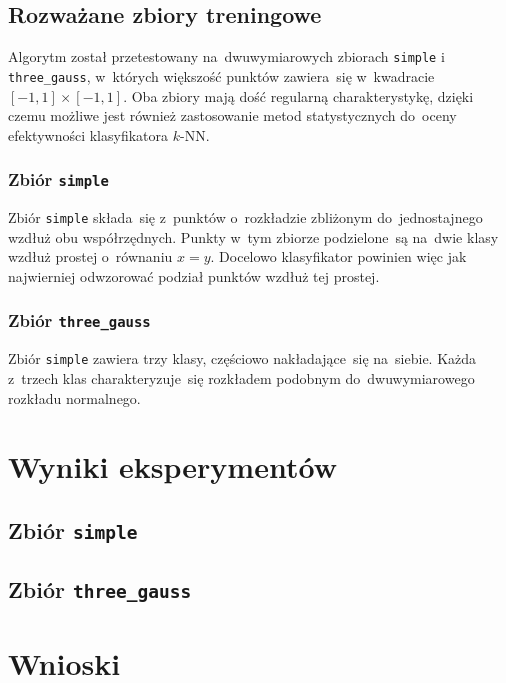 \documentclass[11pt,a4paper]{article}
\begin{document}
\subsection{Rozważane zbiory treningowe}

Algorytm został przetestowany na~dwuwymiarowych zbiorach {\tt simple} i {\tt three\_gauss}, w~których większość punktów zawiera~się w~kwadracie $[-1,1] \times [-1,1]$.
Oba zbiory mają dość regularną charakterystykę, dzięki czemu możliwe jest również zastosowanie metod statystycznych do~oceny efektywności klasyfikatora $k$-NN.

\subsubsection{Zbiór {\tt simple}}

Zbiór {\tt simple} składa~się z~punktów o~rozkładzie zbliżonym do~jednostajnego wzdłuż obu współrzędnych. %
Punkty w~tym zbiorze podzielone~są na~dwie klasy wzdłuż prostej o~równaniu $x=y$.
Docelowo klasyfikator powinien więc jak najwierniej odwzorować podział punktów wzdłuż tej prostej.

\subsubsection{Zbiór {\tt three\_gauss}}

Zbiór {\tt simple} zawiera trzy klasy, częściowo nakładające~się na~siebie.
Każda z~trzech klas charakteryzuje~się rozkładem podobnym do~dwuwymiarowego rozkładu normalnego.


\section{Wyniki eksperymentów}

\subsection{Zbiór {\tt simple}}

\subsection{Zbiór {\tt three\_gauss}}

\section{Wnioski}
\end{document}
